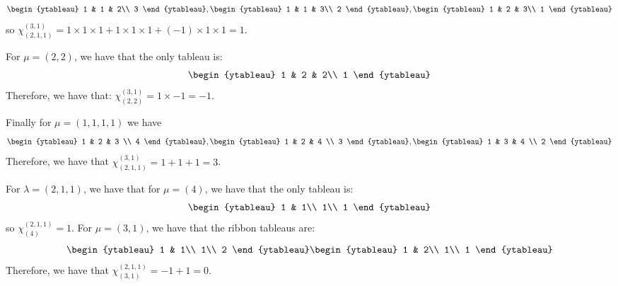 \documentclass[]{article}
\begin{document}
\begin{equation}
	\begin{ytableau}
		1 & 1 & 2\\
		3
	\end{ytableau}
	,
	\begin{ytableau}
	1 & 1 & 3\\
	2
\end{ytableau}
,
	\begin{ytableau}
	1 & 2 & 3\\
	1
\end{ytableau}
\end{equation}
so 
$\chi^{(3,1)}_{(2,1,1)} = 1 \times 1 \times 1 + 1 \times 1 \times 1 + (-1) \times 1 \times 1 = 1$. 

For $\mu = (2,2)$, we have that the only tableau is:
\begin{equation}
	\begin{ytableau}
	1 & 2 & 2\\
	1
\end{ytableau}
\end{equation}
Therefore, we have that:
$\chi^{(3,1)}_{(2,2)} = 1 \times -1 = -1$. 


Finally for $\mu = (1,1,1,1)$ we have 
\begin{equation}
	\begin{ytableau}
		1 & 2 & 3 \\
		4
	\end{ytableau}
	,
	\begin{ytableau}
	1 & 2 & 4 \\
	3
\end{ytableau}
,
	\begin{ytableau}
	1 & 3 & 4 \\
	2
\end{ytableau}
\end{equation}
Therefore, we have that $\chi^{(3,1)}_{(2,1,1)} = 1 + 1 + 1 = 3$. 


For $\lambda = (2,1,1)$, we have that for $\mu = (4)$, we have that the only tableau is:
\begin{equation}
	\begin{ytableau}
		1 & 1\\
		1\\
		1
	\end{ytableau}
\end{equation}
so $\chi^{(2,1,1)}_{(4)} = 1$.
For $\mu = (3,1)$, we have that the ribbon tableaus are:
\begin{equation}
	\begin{ytableau}
		1 & 1\\
		1\\
		2
	\end{ytableau}
	\begin{ytableau}
		1 & 2\\
		1\\
		1
	\end{ytableau}
\end{equation}
Therefore, we have that $\chi^{(2,1,1)}_{(3,1)} = - 1 + 1 = 0$.
\end{document}
